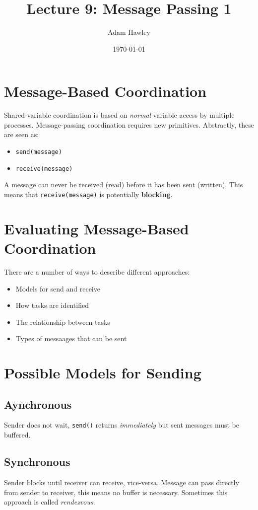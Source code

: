 \documentclass[11pt]{article}
\author{Adam Hawley}
\date{\today}
\title{Lecture 9: Message Passing 1}
\begin{document}
\maketitle
\tableofcontents


\section{Message-Based Coordination}
\label{sec:orge60e68a}
Shared-variable coordination is based on \emph{normal} variable access by multiple processes.
Message-passing coordination requires new primitives.
Abstractly, these are seen as:
\begin{itemize}
\item \texttt{send(message)}
\item \texttt{receive(message)}
\end{itemize}
A message can never be received (read) before it has been sent (written).
This means that \texttt{receive(message)} is potentially \textbf{blocking}.

\section{Evaluating Message-Based Coordination}
\label{sec:orgbb77c1f}
There are a number of ways to describe different approaches:
\begin{itemize}
\item Models for send and receive
\item How tasks are identified
\item The relationship between tasks
\item Types of messaages that can be sent
\end{itemize}

\section{Possible Models for Sending}
\label{sec:org6ff690c}
\subsection{Aynchronous}
\label{sec:org2340f1c}
Sender does not wait, \texttt{send()} returns \emph{immediately} but sent messages must be buffered.
\subsection{Synchronous}
\label{sec:org6c4db6f}
Sender blocks until receiver can receive, vice-versa.
Message can pass directly from sender to receiver, this means no buffer is necessary.
Sometimes this approach is called \emph{rendezvous}.
\end{document}
